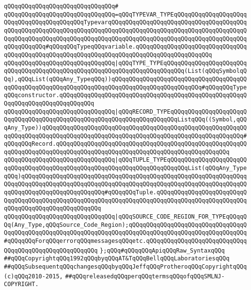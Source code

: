 \verb|qQQqqQQqqQQqqQQqqQQqqQQqqQQqqQQq#|\newline
\verb|qQQqqQQqqQQqqQQqqQQqqQQqqQQqqQQq=qQQqTYPEVAR_TYPEqQQqqQQqqQQqqQQqqQQqqQQqqQQqqQQqqQQqqQQqqQQqTypevarqQQqqQQqqQQqqQQqqQQqqQQqqQQqqQQqqQQqqQQqqQQqqQQqqQQqqQQqqQQqqQQqqQQqqQQqqQQqqQQqqQQqqQQqqQQqqQQqqQQqqQQqqQQqqQQqqQQqqQQqqQQqqQQqqQQqqQQqqQQqqQQqqQQqqQQqqQQqqQQqqQQqqQQqqQQqqQQqqQQqqQQqqQQqqQQq#qQQqqQQqTypeqQQqvariable.qQQqqQQqqQQqqQQqqQQqqQQqqQQqqQQqqQQqqQQqqQQqqQQqqQQqqQQqqQQqqQQqqQQqqQQqqQQqqQQqqQQqqQQqqQQq|\newline
\verb|qQQqqQQqqQQqqQQqqQQqqQQqqQQqqQQq|\verb#|qQQqTYPE_TYPEqQQqqQQqqQQqqQQqqQQqqQQqqQQqqQQqqQQqqQQqqQQqqQQqqQQqqQQqqQQqqQQqqQQqqQQqqQQq(List(qQQqSymbolqQQq),qQQqList(qQQqAny_TypeqQQq))qQQqqQQqqQQqqQQqqQQqqQQqqQQqqQQqqQQqqQQqqQQqqQQqqQQqqQQqqQQqqQQqqQQqqQQqqQQqqQQqqQQqqQQqqQQqqQQq#\verb|#qQQqqQQqTypeqQQqconstructor.qQQqqQQqqQQqqQQqqQQqqQQqqQQqqQQqqQQqqQQqqQQqqQQqqQQqqQQqqQQqqQQqqQQqqQQqqQQqqQQq|\newline
\verb|qQQqqQQqqQQqqQQqqQQqqQQqqQQqqQQq|\verb#|qQQqRECORD_TYPEqQQqqQQqqQQqqQQqqQQqqQQqqQQqqQQqqQQqqQQqqQQqqQQqqQQqqQQqqQQqqQQqqQQqqQQqListqQQq((Symbol,qQQqAny_Type))qQQqqQQqqQQqqQQqqQQqqQQqqQQqqQQqqQQqqQQqqQQqqQQqqQQqqQQqqQQqqQQqqQQqqQQqqQQqqQQqqQQqqQQqqQQqqQQqqQQqqQQqqQQqqQQqqQQqqQQqqQQqqQQq#\verb|#qQQqqQQqRecord.qQQqqQQqqQQqqQQqqQQqqQQqqQQqqQQqqQQqqQQqqQQqqQQqqQQqqQQqqQQqqQQqqQQqqQQqqQQqqQQqqQQqqQQqqQQqqQQqqQQqqQQqqQQqqQQqqQQqqQQq|\newline
\verb|qQQqqQQqqQQqqQQqqQQqqQQqqQQqqQQq|\verb#|qQQqTUPLE_TYPEqQQqqQQqqQQqqQQqqQQqqQQqqQQqqQQqqQQqqQQqqQQqqQQqqQQqqQQqqQQqqQQqqQQqqQQqqQQqList(qQQqAny_TypeqQQq)qQQqqQQqqQQqqQQqqQQqqQQqqQQqqQQqqQQqqQQqqQQqqQQqqQQqqQQqqQQqqQQqqQQqqQQqqQQqqQQqqQQqqQQqqQQqqQQqqQQqqQQqqQQqqQQqqQQqqQQqqQQqqQQqqQQqqQQqqQQqqQQqqQQqqQQqqQQqqQQqqQQq#\verb|#qQQqqQQqTuple.qQQqqQQqqQQqqQQqqQQqqQQqqQQqqQQqqQQqqQQqqQQqqQQqqQQqqQQqqQQqqQQqqQQqqQQqqQQqqQQqqQQqqQQqqQQqqQQqqQQqqQQqqQQqqQQqqQQqqQQqqQQq|\newline
\verb|qQQqqQQqqQQqqQQqqQQqqQQqqQQqqQQq|\verb#|qQQqSOURCE_CODE_REGION_FOR_TYPEqQQqqQQq(Any_Type,qQQqSource_Code_Region);qQQqqQQqqQQqqQQqqQQqqQQqqQQqqQQqqQQqqQQqqQQqqQQqqQQqqQQqqQQqqQQqqQQqqQQqqQQqqQQqqQQqqQQqqQQqqQQqqQQqqQQq#\verb|#qQQqqQQqForqQQqerrorqQQqmessagesqQQqetc.qQQqqQQqqQQqqQQqqQQqqQQqqQQqqQQqqQQqqQQqqQQqqQQqqQQqqQQq|\newline
\newline
\newline
\newline
\verb|};qQQq#qQQqqQQqApiqQQqRaw_SyntaxqQQq|\newline
\newline
\newline
\newline
\newline
\verb|##qQQqCopyrightqQQq1992qQQqbyqQQqAT&TqQQqBellqQQqLaboratoriesqQQq|\newline
\verb|##qQQqSubsequentqQQqchangesqQQqbyqQQqJeffqQQqProtheroqQQqCopyrightqQQq(c)qQQq2010-2015,|\newline
\verb|##qQQqreleasedqQQqperqQQqtermsqQQqofqQQqSMLNJ-COPYRIGHT.|\newline

